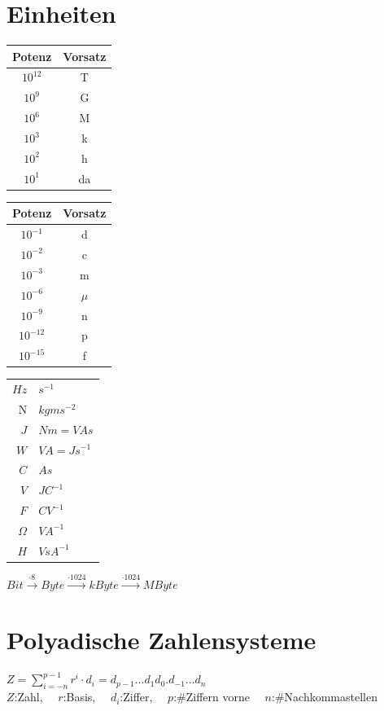 \documentclass[6pt,a4paper]{scrartcl}
\begin{document}
\begin{multicols}{3}
\section{Einheiten}
\begin{multicols}{3}
\begin{tabular}{c | c}
	Potenz & Vorsatz \\ \midrule
	$10^{12}$ & T \\
	$10^{9}$ & G \\
	$10^{6}$ & M \\
	$10^{3}$ & k \\
	$10^{2}$ & h \\
	$10^{1}$ & da 
\end{tabular}
\begin{tabular}{c | c}
	Potenz & Vorsatz \\ \midrule
	$10^{-1}$ & d \\
	$10^{-2}$ & c \\
	$10^{-3}$ & m \\
	$10^{-6}$ & $\mu$	\\
	$10^{-9}$ & n \\
	$10^{-12}$ & p \\
	$10^{-15}$ & f
\end{tabular}
\begin{tabular}{ r | l }
$Hz$ & $s^{-1}$ \\
N & $kg m s^{-2} $ \\
$J $ & $ N m = V A s$\\
$W $ & $ V A  = J s^{-1} $ \\
$ C $ & $ A s $ \\
$V $ & $ J C^{-1} $\\
$F $ & $ C V^{-1} $ \\
$\Omega $ & $ V A^{-1} $\\
$ H $ & $ V s  A^{-1}$
\end{tabular}
\end{multicols}
$Bit \xrightarrow{\cdot 8} Byte \xrightarrow{\cdot 1024} kByte \xrightarrow{\cdot 1024} MByte$\\

\section{Polyadische Zahlensysteme}
$Z = \sum\limits^{p-1}_{i = -n} r^i \cdot d_i = d_{p-1}...d_1 d_0 . d_{-1} ... d_n$\\
$Z$:Zahl, \ \ $r$:Basis, \ \ $d_i$:Ziffer, \ \ $p$:\#Ziffern vorne \ \ $n$:\#Nachkommastellen


\end{multicols}
\end{document}
